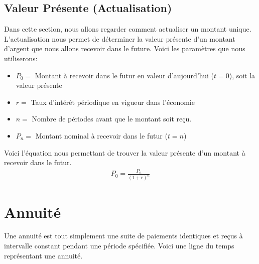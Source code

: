 \documentclass[letterpaper, 12pt]{article}
\newcommand{\1}{\mathds{1}}	%
\theoremstyle{definition}
\begin{document}
\subsection{Valeur Présente (Actualisation)}
Dans cette section, nous allons regarder comment actualiser un montant unique. L'actualisation nous permet de déterminer la valeur présente d'un montant d'argent que nous allons recevoir dans le future. Voici les paramètres que nous utiliserons:
\begin{itemize}
\item $P_0=$ Montant à recevoir dans le futur en valeur d'aujourd'hui ($t=0$), soit la valeur présente  
\item $r=$ Taux d'intérêt périodique en vigueur dans l'économie
\item $n=$ Nombre de périodes avant que le montant soit reçu.
\item $P_n=$ Montant nominal à recevoir dans le futur ($t=n$)
\end{itemize}

Voici l'équation nous permettant de trouver la valeur présente d'un montant à recevoir dans le futur.
\begin{align*}
P_0=\frac{P_n}{(1+r)^n}
\end{align*}

\pagebreak \newpage

\section{Annuité}

Une annuité est tout simplement une suite de paiements identiques et reçus à intervalle constant pendant une période spécifiée. Voici une ligne du temps représentant une annuité.

\end{document}
